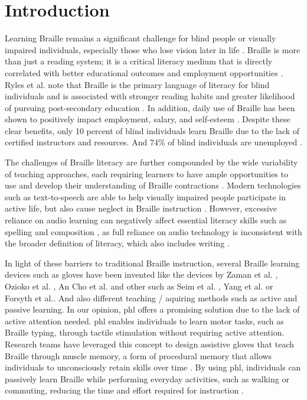\chapter{Introduction}
\label{ch:Introduction}

Learning Braille remains a significant challenge for blind people or visually impaired individuals, especially those who lose vision later in life \cite{Seim2014a}. Braille is more than just a reading system; it is a critical literacy medium that is directly correlated with better educational outcomes and employment opportunities \cite{Seim2014a, Ryles1996}. Ryles et al. note that Braille is the primary language of literacy for blind individuals and is associated with stronger reading habits and greater likelihood of pursuing post-secondary education \cite{Ryles1996}. In addition, daily use of Braille has been shown to positively impact employment, salary, and self-esteem \cite{Bell2013}. Despite these clear benefits, only 10 percent of blind individuals learn Braille due to the lack of certified instructors and resources. And 74\% of blind individuals are unemployed \cite{Seim2014a}.

The challenges of Braille literacy are further compounded by the wide variability of teaching approaches, each requiring learners to have ample opportunities to use and develop their understanding of Braille contractions \cite{Swenson1999}. Modern technologies such as text-to-speech are able to help visually impaired people participate in active life, but also cause neglect in Braille instruction \cite{Seim2014a}. However, excessive reliance on audio learning can negatively affect essential literacy skills such as spelling and composition \cite{Foulke1979}, as full reliance on audio technology is inconsistent with the broader definition of literacy, which also includes writing \cite{tuttle1996point}.

In light of these barriers to traditional Braille instruction, several Braille learning devices such as gloves have been invented like the devices by Zaman et al. \cite{Zaman2019}, Ozioko et al. \cite{Ozioko2017}, An \cite{An2004} Cho et al. \cite{Cho2002} and other such as Seim et al. \cite{Seim2014a, Seim2014, Seim2015}, Yang et al. \cite{Yang2017} or Forsyth et al.\cite{Learning2024}.
And also different teaching / aquiring methods such as active and passive learning. In our opinion, \gls{phl} offers a promising solution due to the lack of active attention needed. \Gls{phl} enables individuals to learn motor tasks, such as Braille typing, through tactile stimulation without requiring active attention. Research teams have leveraged this concept to design assistive gloves that teach Braille through muscle memory, a form of procedural memory that allows individuals to unconsciously retain skills over time \cite{Yang2017,Seim2015}. By using \gls{phl}, individuals can passively learn Braille while performing everyday activities, such as walking or commuting, reducing the time and effort required for instruction \cite{Yang2017}.

